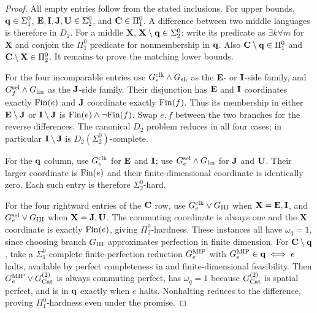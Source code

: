\begin{proof}
All empty entries follow from the stated inclusions. For upper bounds, $\mathbf q\in\Sigma^0_1$, $\mathbf E,\mathbf I,\mathbf J,\mathbf U\in\Sigma^0_2$, and $\mathbf C\in\Pi^0_1$. A difference between two middle languages is therefore in $D_2$. For a middle $\mathbf X$, $\mathbf X\setminus\mathbf q\in\Sigma^0_2$: write its predicate as $\exists k\forall m$ for $\mathbf X$ and conjoin the $\Pi^0_1$ predicate for nonmembership in $\mathbf q$. Also $\mathbf C\setminus\mathbf q\in\Pi^0_1$ and $\mathbf C\setminus\mathbf X\in\Pi^0_2$. It remains to prove the matching lower bounds.

For the four incomparable entries use $G^{\rm clk}_e\wedge G_{\rm sh}$ as the $\mathbf E$- or $\mathbf I$-side family, and $G^{\rm sel}_f\wedge G_{\rm lin}$ as the $\mathbf J$-side family. Their disjunction has $\mathbf E$ and $\mathbf I$ coordinates exactly $\mathrm{Fin}(e)$ and $\mathbf J$ coordinate exactly $\mathrm{Fin}(f)$. Thus its membership in either $\mathbf E\setminus\mathbf J$ or $\mathbf I\setminus\mathbf J$ is $\mathrm{Fin}(e)\wedge\neg \mathrm{Fin}(f)$. Swap $e,f$ between the two branches for the reverse differences. The canonical $D_2$ problem reduces in all four cases; in particular $\mathbf I\setminus\mathbf J$ is $D_2(\Sigma^0_2)$-complete.

For the $\mathbf q$ column, use $G^{\rm clk}_e$ for $\mathbf E$ and $\mathbf I$; use $G^{\rm sel}_e\wedge G_{\rm lin}$ for $\mathbf J$ and $\mathbf U$. Their larger coordinate is $\mathrm{Fin}(e)$ and their finite-dimensional coordinate is identically zero. Each such entry is therefore $\Sigma^0_2$-hard.

For the four rightward entries of the $\mathbf C$ row, use $G^{\rm clk}_e\vee G_{\mathrm{III}}$ when $\mathbf X=\mathbf E,\mathbf I$, and $G^{\rm sel}_e\vee G_{\mathrm{III}}$ when $\mathbf X=\mathbf J,\mathbf U$. The commuting coordinate is always one and the $\mathbf X$ coordinate is exactly $\mathrm{Fin}(e)$, giving $\Pi^0_2$-hardness. These instances all have $\omega_q=1$, since choosing branch $G_{\mathrm{III}}$ approximates perfection in finite dimension. For $\mathbf C\setminus\mathbf q$, take a $\Sigma^0_1$-complete finite-perfection reduction $G^{\rm MIP}_e$ with $G^{\rm MIP}_e\in\mathbf q\iff e$ halts, available by perfect completeness in \cite[Theorem 12.6]{MIPRE} and finite-dimensional feasibility. Then $G^{\rm MIP}_e\vee G^{(2)}_{\operatorname{Cat}}$ is always commuting perfect, has $\omega_q=1$ because $G^{(2)}_{\operatorname{Cat}}$ is spatial perfect, and is in $\mathbf q$ exactly when $e$ halts. Nonhalting reduces to the difference, proving $\Pi^0_1$-hardness even under the promise.


\end{proof}
